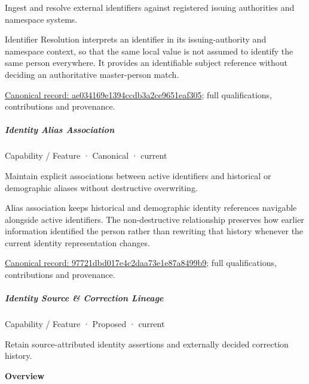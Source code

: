 Ingest and resolve external identifiers against registered issuing authorities and namespace systems.



Identifier Resolution interprets an identifier in its issuing-authority and namespace context, so that the same local value is not assumed to identify the same person everywhere. It provides an identifiable subject reference without deciding an authoritative master-person match.


{\footnotesize \href{../../../../continuum/strategy/capability/feature/ae034169e1394ccdb3a2ce9651eaf305.md}{Canonical record: ae034169e1394ccdb3a2ce9651eaf305}; full qualifications, contributions and provenance.}\par
\subparagraph{Identity Alias Association}


\label{element:97721dbd017e4c2daa73e1e87a8499b9}
{\small Capability / Feature · Canonical · current}\par

Maintain explicit associations between active identifiers and historical or demographic aliases without destructive overwriting.



Alias association keeps historical and demographic identity references navigable alongside active identifiers. The non-destructive relationship preserves how earlier information identified the person rather than rewriting that history whenever the current identity representation changes.


{\footnotesize \href{../../../../continuum/strategy/capability/feature/97721dbd017e4c2daa73e1e87a8499b9.md}{Canonical record: 97721dbd017e4c2daa73e1e87a8499b9}; full qualifications, contributions and provenance.}\par
\subparagraph{Identity Source \& Correction Lineage}


\label{element:d72134e75001449a9e7ffae53f61458f}
{\small Capability / Feature · Proposed · current}\par

Retain source-attributed identity assertions and externally decided correction history.



\textbf{Overview}



